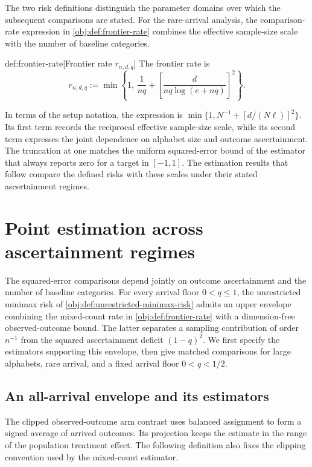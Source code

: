 \documentclass[11pt]{article}
\begin{document}
The two risk definitions distinguish the parameter domains over which the subsequent comparisons are stated. For the rare-arrival analysis, the comparison-rate expression  in \cref{obj:def:frontier-rate} combines the effective sample-size scale with the number of baseline categories.

\begin{definitionv}{def:frontier-rate}[Frontier rate \(r_{n,d,q}\)]
The frontier rate is
\[
r_{n,d,q}
:=
\min\left\{
1,\,
\frac{1}{nq}
+
\left[\frac{d}{nq\log(e+nq)}\right]^2
\right\}.
\]
\end{definitionv}

In terms of the setup notation, the expression is \(\min\{1,N^{-1}+[d/(N\ell)]^2\}\). Its first term records the reciprocal effective sample-size scale, while its second term expresses the joint dependence on alphabet size and outcome ascertainment. The truncation at one matches the uniform squared-error bound of the estimator that always reports zero for a target in \([-1,1]\). The estimation results that follow compare the defined risks with these scales under their stated ascertainment regimes.


\section{Point estimation across ascertainment regimes}

The squared-error comparisons depend jointly on outcome ascertainment and the number of baseline categories. For every arrival floor \(0<q\le1\), the unrestricted minimax risk  of \cref{obj:def:unrestricted-minimax-risk} admits an upper envelope combining the mixed-count rate in \cref{obj:def:frontier-rate} with a dimension-free observed-outcome bound. The latter separates a sampling contribution of order \(n^{-1}\) from the squared ascertainment deficit \((1-q)^2\). We first specify the estimators supporting this envelope, then give matched comparisons for large alphabets, rare arrival, and a fixed arrival floor \(0<q<1/2\).

\subsection{An all-arrival envelope and its estimators}

The clipped observed-outcome arm contrast  uses balanced assignment to form a signed average of arrived outcomes. Its projection  keeps the estimate in the range of the population treatment effect. The following definition also fixes the clipping convention used by the mixed-count estimator.
\end{document}
